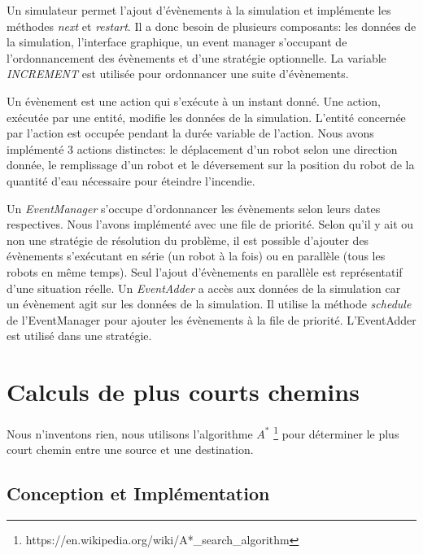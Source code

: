 \documentclass[a4paper, 10pt, french]{article}
\begin{document}
	Un simulateur permet l'ajout d'évènements à la simulation et implémente les méthodes {\it next} et {\it restart}. Il a donc besoin de plusieurs composants: les données de la simulation, l'interface graphique, un event manager s'occupant de l'ordonnancement des évènements et d'une stratégie optionnelle. La variable {\it INCREMENT} est utilisée pour ordonnancer une suite d'évènements. 
	\par\leavevmode\par
	Un évènement est une action qui s'exécute à un instant donné. Une action, exécutée par une entité, modifie les données de la simulation. L'entité concernée par l'action est occupée pendant la durée variable de l'action.
	Nous avons implémenté 3 actions distinctes: le déplacement d'un robot selon une direction donnée, le remplissage d'un robot et le déversement sur la position du robot de la quantité d'eau nécessaire pour éteindre l'incendie.
	\par\leavevmode\par
	Un {\it EventManager} s'occupe d'ordonnancer les évènements selon leurs dates respectives. Nous l'avons implémenté avec une file de priorité. Selon qu'il y ait ou non une stratégie de résolution du problème, il est possible d'ajouter des évènements s'exécutant en série (un robot à la fois) ou en parallèle (tous les robots en même temps). Seul l'ajout d'évènements en parallèle est représentatif d'une situation réelle. Un {\it EventAdder} a accès aux données de la simulation car un évènement agit sur les données de la simulation. Il utilise la méthode {\it schedule} de l'EventManager pour ajouter les évènements à la file de priorité. L'EventAdder est utilisé dans une stratégie.

\section{Calculs de plus courts chemins}

	Nous n'inventons rien, nous utilisons l'algorithme $A^*$ \footnote{https://en.wikipedia.org/wiki/A*\_search\_algorithm} pour déterminer le plus court chemin entre une source et une destination. 

	\subsection{Conception et Implémentation}
\end{document}
